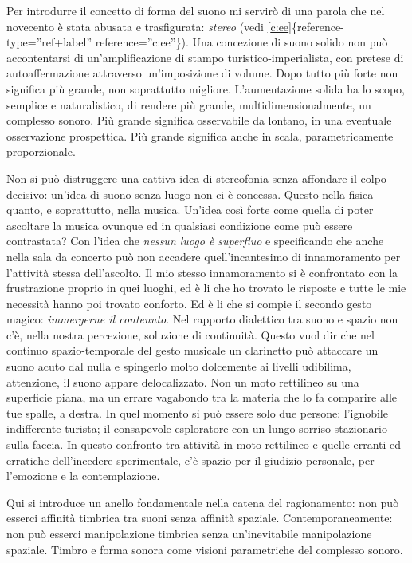 \documentclass[a4paper,11pt]{article}
\begin{document}
Per introdurre il concetto di forma del suono mi servirò di una parola
che nel novecento è stata abusata e trasfigurata: \emph{stereo} (vedi
\hyperlink{c:ee}{{[}c:ee{]}}\{reference-type=''ref+label'' reference=''c:ee''\}). Una
concezione di suono solido non può accontentarsi di un'amplificazione di
stampo turistico-imperialista, con pretese di autoaffermazione
attraverso un'imposizione di volume. Dopo tutto più forte non significa
più grande, non soprattutto migliore. L'aumentazione solida ha lo scopo,
semplice e naturalistico, di rendere più grande, multidimensionalmente,
un complesso sonoro. Più grande significa osservabile da lontano, in una
eventuale osservazione prospettica. Più grande significa anche in scala,
parametricamente proporzionale.

Non si può distruggere una cattiva idea di stereofonia senza affondare
il colpo decisivo: un'idea di suono senza luogo non ci è concessa.
Questo nella fisica quanto, e soprattutto, nella musica. Un'idea così
forte come quella di poter ascoltare la musica ovunque ed in qualsiasi
condizione come può essere contrastata? Con l'idea che \emph{nessun luogo è
superfluo} e specificando che anche nella sala da concerto può non
accadere quell'incantesimo di innamoramento per l'attività stessa
dell'ascolto. Il mio stesso innamoramento si è confrontato con la
frustrazione proprio in quei luoghi, ed è li che ho trovato le risposte
e tutte le mie necessità hanno poi trovato conforto. Ed è li che si
compie il secondo gesto magico: \emph{immergerne il contenuto}. Nel rapporto
dialettico tra suono e spazio non c'è, nella nostra percezione,
soluzione di continuità. Questo vuol dir che nel continuo
spazio-temporale del gesto musicale un clarinetto può attaccare un suono
acuto dal nulla e spingerlo molto dolcemente ai livelli udibilima,
attenzione, il suono appare delocalizzato. Non un moto rettilineo su una
superficie piana, ma un errare vagabondo tra la materia che lo fa
comparire alle tue spalle, a destra. In quel momento si può essere solo
due persone: l'ignobile indifferente turista; il consapevole esploratore
con un lungo sorriso stazionario sulla faccia. In questo confronto tra
attività in moto rettilineo e quelle erranti ed erratiche dell'incedere
sperimentale, c'è spazio per il giudizio personale, per l'emozione e la
contemplazione.

Qui si introduce un anello fondamentale nella catena del ragionamento:
non può esserci affinità timbrica tra suoni senza affinità spaziale.
Contemporaneamente: non può esserci manipolazione timbrica senza
un'inevitabile manipolazione spaziale. Timbro e forma sonora come
visioni parametriche del complesso sonoro.
\end{document}
